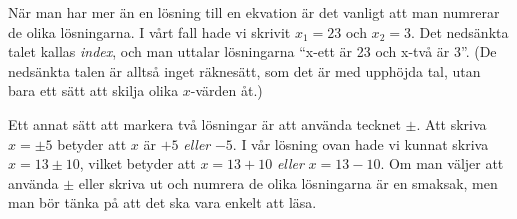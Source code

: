 När man har mer än en lösning till en ekvation är det vanligt att man numrerar de olika lösningarna.
I vårt fall hade vi skrivit $x_1=23$ och $x_2=3$.
Det nedsänkta talet kallas \emph{index}, och man uttalar lösningarna ``x-ett är 23 och x-två är 3''.
(De nedsänkta talen är alltså inget räknesätt, som det är med upphöjda tal, utan bara ett sätt att skilja olika $x$-värden åt.)

Ett annat sätt att markera två lösningar är att använda tecknet $\pm$.
Att skriva $x=\pm 5$ betyder att $x$ är $+5$ \emph{eller} $-5$.
I vår lösning ovan hade vi kunnat skriva $x=13 \pm 10$, vilket betyder att $x=13+10$ \emph{eller} $x=13-10$.
Om man väljer att använda $\pm$ eller skriva ut och numrera de olika lösningarna är en smaksak, men man bör tänka på att det ska vara enkelt att läsa.
